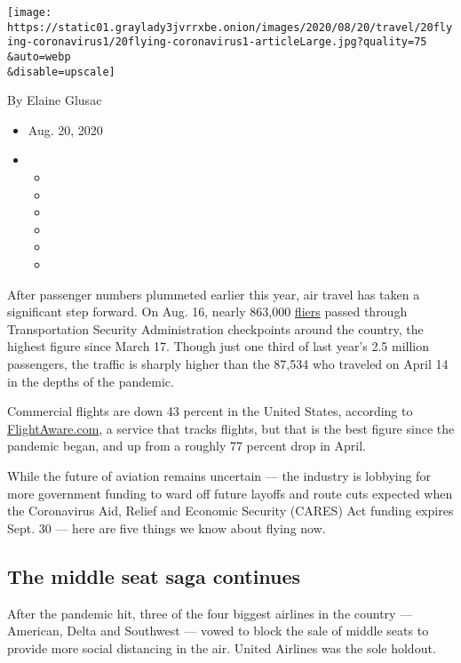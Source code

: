 \texttt{[image: https://static01.graylady3jvrrxbe.onion/images/2020/08/20/travel/20flying-coronavirus1/20flying-coronavirus1-articleLarge.jpg?quality=75\\\&auto=webp\\\&disable=upscale]}

By Elaine Glusac

\begin{itemize}
\item
  Aug. 20, 2020
\item
  \begin{itemize}
  \item
  \item
  \item
  \item
  \item
  \item
  \end{itemize}
\end{itemize}

After passenger numbers plummeted earlier this year, air travel has
taken a significant step forward. On Aug. 16, nearly 863,000
\href{https://www.tsa.gov/coronavirus/passenger-throughput}{fliers}
passed through Transportation Security Administration checkpoints around
the country, the highest figure since March 17. Though just one third of
last year's 2.5 million passengers, the traffic is sharply higher than
the 87,534 who traveled on April 14 in the depths of the pandemic.

Commercial flights are down 43 percent in the United States, according
to
\href{https://flightaware.com/news/article/Aviation-Recovery-at-50/1486}{FlightAware.com},
a service that tracks flights, but that is the best figure since the
pandemic began, and up from a roughly 77 percent drop in April.

While the future of aviation remains uncertain --- the industry is
lobbying for more government funding to ward off future layoffs and
route cuts expected when the Coronavirus Aid, Relief and Economic
Security (CARES) Act funding expires Sept. 30 --- here are five things
we know about flying now.

\hypertarget{the-middle-seat-saga-continues}{%
\subsection{The middle seat saga
continues}\label{the-middle-seat-saga-continues}}

After the pandemic hit, three of the four biggest airlines in the
country --- American, Delta and Southwest --- vowed to block the sale of
middle seats to provide more social distancing in the air. United
Airlines was the sole holdout.

